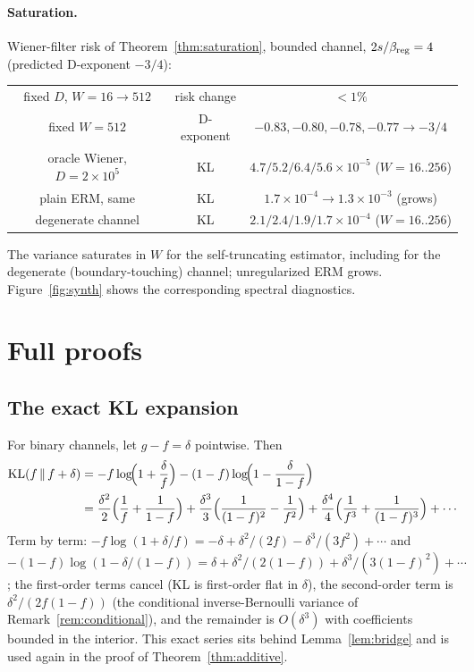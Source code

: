 \documentclass[12pt]{article}
\newcommand{\KL}{\operatorname{KL}}
\theoremstyle{remark}
\begin{document}
\paragraph{Saturation.}
Wiener-filter risk of Theorem~\ref{thm:saturation}, bounded channel,
$2s/\beta_{\rm reg}=4$ (predicted D-exponent $-3/4$):
\begin{center}
\begin{tabular}{ccc}
\toprule
fixed $D$, $W=16\to512$ & risk change & $<1\%$ \\
fixed $W=512$ & D-exponent & $-0.83,-0.80,-0.78,-0.77\to-3/4$ \\
oracle Wiener, $D=2\times10^5$ & KL & $4.7/5.2/6.4/5.6\times10^{-5}$ ($W=16..256$)\\
plain ERM, same & KL & $1.7\times10^{-4}\to1.3\times10^{-3}$ (grows) \\
degenerate channel & KL & $2.1/2.4/1.9/1.7\times10^{-4}$ ($W=16..256$)\\
\bottomrule
\end{tabular}
\end{center}
The variance saturates in $W$ for the self-truncating estimator, including for
the degenerate (boundary-touching) channel; unregularized ERM grows.
Figure~\ref{fig:synth} shows the corresponding spectral diagnostics.


\clearpage
\appendix
\section{Full proofs}
\label{app:proofs}

\subsection{The exact KL expansion}
\label{app:klseries}
For binary channels, let $g-f=\delta$ pointwise. Then
\begin{align}
  \KL(f\,\|\,f+\delta)
  &= -f\log\!\Bigl(1+\frac{\delta}{f}\Bigr)
   -(1-f)\log\!\Bigl(1-\frac{\delta}{1-f}\Bigr) \notag\\
  &= \frac{\delta^2}{2}\Bigl(\frac1f+\frac1{1-f}\Bigr)
   + \frac{\delta^3}{3}\Bigl(\frac1{(1-f)^2}-\frac1{f^2}\Bigr)
   + \frac{\delta^4}{4}\Bigl(\frac1{f^3}+\frac1{(1-f)^3}\Bigr)+\cdots
  \label{eq:klseries}
\end{align}
Term by term: $-f\log(1+\delta/f)=-\delta+\delta^2/(2f)-\delta^3/(3f^2)+\cdots$
and $-(1-f)\log(1-\delta/(1-f))=\delta+\delta^2/(2(1-f))+\delta^3/(3(1-f)^2)+\cdots$;
the first-order terms cancel (KL is first-order flat in $\delta$), the
second-order term is $\delta^2/(2f(1-f))$ (the conditional inverse-Bernoulli
variance of Remark~\ref{rem:conditional}), and the remainder is
$O(\delta^3)$ with coefficients bounded in the interior. This exact series
sits behind Lemma~\ref{lem:bridge} and is used again in the proof of
Theorem~\ref{thm:additive}.
\end{document}
